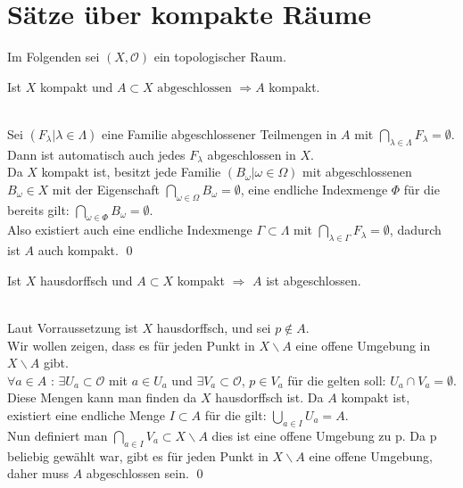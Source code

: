 \chapter{Sätze über kompakte Räume}
Im Folgenden sei \((X,\mathcal{O})\) ein topologischer Raum.
	\begin{Satz}
		Ist \(X\) kompakt und \(A \subset X \mbox{ abgeschlossen } \Rightarrow A\) kompakt.
	\end{Satz}
		\\
		Sei \((F_{\lambda} | \lambda \in \Lambda) \) eine Familie abgeschlossener Teilmengen in \(A\) mit \( \bigcap_{\lambda \in \Lambda } F_{\lambda} = \emptyset \).\\
		Dann ist automatisch auch jedes \(F_{\lambda} \) abgeschlossen in \(X\).\\
		Da \(X\) kompakt ist, besitzt jede Familie \((B_{\omega} | \omega \in \Omega) \) mit abgeschlossenen 
		\(B_{\omega} \in X \) mit der Eigenschaft \( \bigcap_{\omega \in \Omega} B_{\omega} = \emptyset\), eine 
		endliche Indexmenge \(\Phi\) für die bereits gilt: \( \bigcap_{\omega \in \Phi} B_{\omega} = \emptyset\).\\
		Also existiert auch eine endliche Indexmenge \( \Gamma \subset \Lambda \) mit \( \bigcap_{\lambda \in \Gamma } F_{\lambda} = \emptyset \), dadurch ist 
		\(A\) auch kompakt.
	\qed
		
		
	\begin{Satz}
		Ist \(X\) hausdorffsch und \(A \subset X \) kompakt \( \Rightarrow \) \(A\) ist abgeschlossen.
	\end{Satz}
		\\
		Laut Vorraussetzung ist \(X\) hausdorffsch, und sei \(p \notin A \). \\
		Wir wollen zeigen, dass es für jeden Punkt in \(X \backslash A \) eine offene Umgebung in \(X \backslash A \) gibt.\\
		\( \forall a \in A\) : \(\exists U_{a}\subset \mathcal{O} \) mit \(  a \in U_{a}\) und \(\exists V_{a}\subset \mathcal{O} \), \(  p \in V_{a}\) für die gelten soll:
		 \(U_{a} \cap V_{a} = \emptyset \). Diese Mengen kann man finden da \(X\) hausdorffsch ist. Da \(A\) kompakt ist, existiert eine endliche Menge \(I \subset A\) für die gilt:
		\( \bigcup_{a \in I} U_{a} = A \). \\
		Nun definiert man \(\bigcap_{a \in I} V_{a} \subset X\backslash A \) dies ist eine offene Umgebung zu p. Da p beliebig gewählt war, gibt es 
		für jeden Punkt in \(X\backslash A \) eine offene Umgebung, daher muss \(A\) abgeschlossen sein. 
	\qed
		
